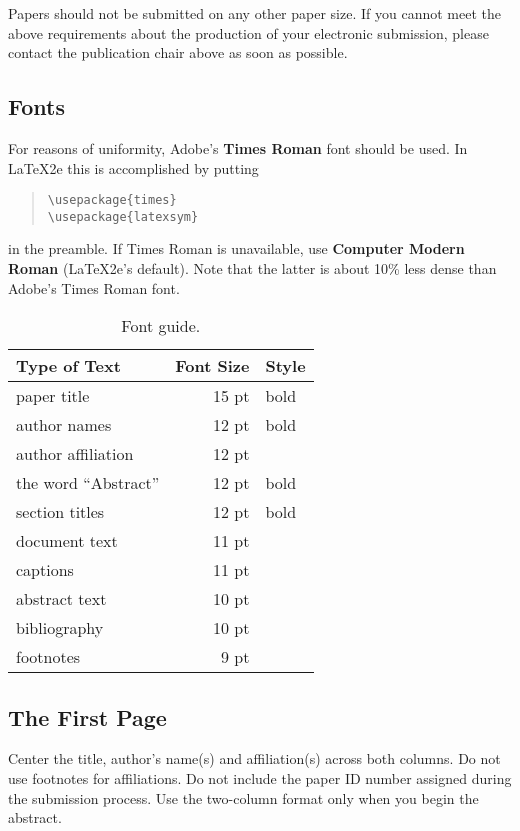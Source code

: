 \documentclass[11pt]{article}
\begin{document}
\noindent Papers should not be submitted on any other paper size. If you cannot meet the above requirements about the production of your electronic submission, please contact the publication chair above as soon as possible.

\subsection{Fonts}

For reasons of uniformity, Adobe's {\bf Times Roman} font should be
used. In \LaTeX2e{} this is accomplished by putting

\begin{quote}
\begin{verbatim}
\usepackage{times}
\usepackage{latexsym}
\end{verbatim}
\end{quote}
in the preamble. If Times Roman is unavailable, use {\bf Computer
  Modern Roman} (\LaTeX2e{}'s default).  Note that the latter is about
  10\% less dense than Adobe's Times Roman font.


\begin{table}[h]
\begin{center}
\begin{tabular}{|l|rl|}
\hline \bf Type of Text & \bf Font Size & \bf Style \\ \hline
paper title & 15 pt & bold \\
author names & 12 pt & bold \\
author affiliation & 12 pt & \\
the word ``Abstract'' & 12 pt & bold \\
section titles & 12 pt & bold \\
document text & 11 pt  &\\
captions & 11 pt & \\
abstract text & 10 pt & \\
bibliography & 10 pt & \\
footnotes & 9 pt & \\
\hline
\end{tabular}
\end{center}
\caption{\label{font-table} Font guide. }
\end{table}

\subsection{The First Page}
\label{ssec:first}

Center the title, author's name(s) and affiliation(s) across both
columns. Do not use footnotes for affiliations.  Do not include the
paper ID number assigned during the submission process.
Use the two-column format only when you begin the abstract.
\end{document}
